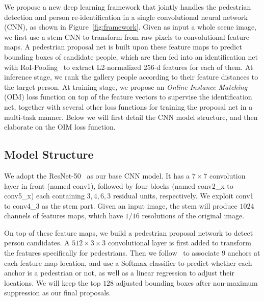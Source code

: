 \documentclass[10pt,twocolumn,letterpaper]{article}
\begin{document}
We propose a new deep learning framework that jointly handles the pedestrian detection and person re-identification in a single convolutional neural network (CNN), as shown in Figure~\ref{fig:framework}. Given as input a whole scene image, we first use a stem CNN to transform from raw pixels to convolutional feature maps. A pedestrian proposal net is built upon these feature maps to predict bounding boxes of candidate people, which are then fed into an identification net with RoI-Pooling~\cite{girshick2015fast} to extract L2-normalized $256$-d features for each of them. At inference stage, we rank the gallery people according to their feature distances to the target person. At training stage, we propose an \textit{Online Instance Matching} (OIM) loss function on top of the feature vectors to supervise the identification net, together with several other loss functions for training the proposal net in a multi-task manner. Below we will first detail the CNN model structure, and then elaborate on the OIM loss function.

\subsection{Model Structure} %
\label{sub:model_structure}
We adopt the ResNet-50~\cite{he2015deep} as our base CNN model. It has a $7\times 7$ convolution layer in front (named conv1), followed by four blocks (named conv2\_x to conv5\_x) each containing $3, 4, 6, 3$ residual units, respectively. We exploit conv1 to conv4\_3 as the stem part. Given an input image, the stem will produce $1024$ channels of features maps, which have $1/16$ resolutions of the original image.

On top of these feature maps, we build a pedestrian proposal network to detect person candidates. A $512\times3\times3$ convolutional layer is first added to transform the features specifically for pedestrians. Then we follow~\cite{ren2015faster} to associate $9$ anchors at each feature map location, and use a Softmax classifier to predict whether each anchor is a pedestrian or not, as well as a linear regression to adjust their locations. We will keep the top $128$ adjusted bounding boxes after non-maximum suppression as our final proposals.
\end{document}

